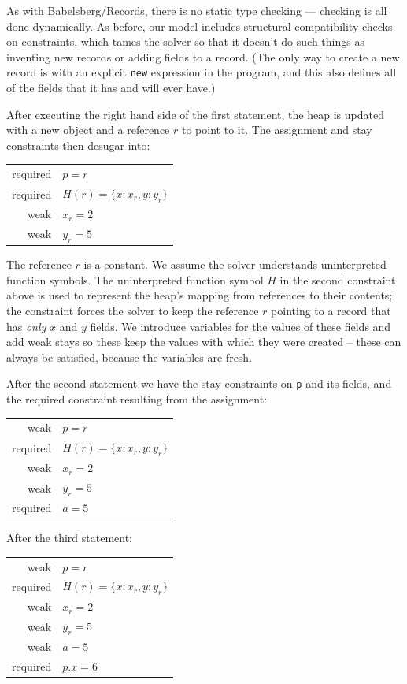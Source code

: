 \documentclass{article}
\begin{document}
As with Babelsberg/Records, there is no static type checking ---
checking is all done dynamically.  As before, our model includes
structural compatibility checks on constraints, which tames the solver so
that it doesn't do such things as inventing new records or adding fields
to a record.  (The only way to create a new record is with an explicit
\verb|new| expression in the program, and this also defines all of the
fields that it has and will ever have.)

After executing the right hand side of the first statement, the heap
is updated with a new object and a reference $r$ to point to it. The
assignment and stay constraints then desugar into:

\begin{tabular}{rl}
required & $p = r$ \\
required & $H(r) = \{x:x_r, y:y_r\}$\\
weak & $x_r = 2$\\
weak & $y_r = 5$\\
\end{tabular}

The reference $r$ is a constant. We assume the solver understands
uninterpreted function symbols.  The uninterpreted function symbol $H$
in the second constraint above is used to represent the heap's mapping
from references to their contents; the constraint forces the solver to
keep the reference $r$ pointing to a record that has \emph{only} $x$
and $y$ fields. We introduce variables for the values of these fields
and add weak stays so these keep the values with which they were
created -- these can always be satisfied, because the variables are
fresh.

After the second statement we have the stay constraints on \verb|p|
and its fields, and the required constraint resulting from the
assignment:

\begin{tabular}{rl}
weak & $p = r$ \\
required & $H(r) = \{x:x_r, y:y_r\}$\\
weak & $x_r = 2$\\
weak & $y_r = 5$\\
required & $a = 5$
\end{tabular}

After the third statement:

\begin{tabular}{rl}
weak & $p = r$ \\
required & $H(r) = \{x:x_r, y:y_r\}$\\
weak & $x_r = 2$\\
weak & $y_r = 5$\\
weak & $a = 5$ \\
required & $p.x = 6$
\end{tabular}
\end{document}
